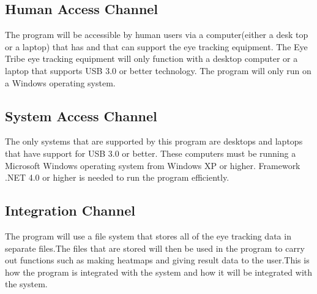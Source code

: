 

\subsection{Human Access Channel}
    The program will be accessible by human users via a computer(either a desk top or a laptop) that has and that can support the eye tracking equipment. The Eye Tribe eye tracking equipment will only function with a desktop computer or a laptop that supports USB 3.0 or better technology. The program will only run on a Windows operating system.
\subsection{System Access Channel}
    The only systems that are supported by this program are desktops and laptops that have support for USB 3.0 or better. These computers must be running a Microsoft Windows operating system from Windows XP or higher. Framework .NET 4.0 or higher is needed to run the program efficiently.
\subsection{Integration Channel}
The program will use a file system that stores all of the eye tracking data in separate files.The files that are stored will then be used in the program to carry out functions such as making heatmaps and giving result data to the user.This is how the program is integrated with the system and how it will be integrated with the system.